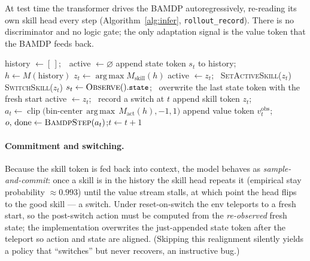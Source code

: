 \documentclass[11pt]{article}
\newcommand{\st}{s}
\newcommand{\skill}{z}
\newcommand{\argmax}{\operatorname*{arg\,max}}
\newcommand{\code}[1]{\texttt{\small #1}}
\begin{document}
At test time the transformer drives the BAMDP autoregressively, re-reading its own
skill head every step (Algorithm~\ref{alg:infer}, \code{rollout\_record}). There is no
discriminator and no logic gate; the only adaptation signal is the value token that
the BAMDP feeds back.

\begin{algorithm}[t]
\caption{Closed-loop rollout with on-line skill switching (\code{rollout\_record})}
\label{alg:infer}
\begin{algorithmic}[1]
\State history $\gets[\,]$;\ \ active $\gets \varnothing$
  \State append state token $\st_t$ to history; \ $h\gets M(\text{history})$
  \State $\skill_t \gets \argmax M_{\mathrm{skill}}(h)$
     \State active $\gets \skill_t$; \ \textsc{SetActiveSkill}($\skill_t$)
  \ElsIf{$\skill_t \neq$ active}
     \State \textsc{SwitchSkill}($\skill_t$)
     \State $\st_t \gets \textsc{Observe}().\code{state}$; \ overwrite the last state
            token with the fresh start
     \State active $\gets \skill_t$; \ record a switch at $t$
  \EndIf
  \State append skill token $\skill_t$;\quad
         $a_t \gets \operatorname{clip}\big(\text{bin-center}\,\argmax\,
         M_{\mathrm{act}}(h),-1,1\big)$
  \State append value token $v^{\mathrm{obs}}_t$;\quad
         $o,\,\text{done}\gets\textsc{BamdpStep}(a_t)$;\quad $t\gets t{+}1$
\EndWhile
\end{algorithmic}
\end{algorithm}

\paragraph{Commitment and switching.}
Because the skill token is fed back into context, the model behaves as
\emph{sample-and-commit}: once a skill is in the history the skill head repeats it
(empirical stay probability $\approx0.993$) until the value stream stalls, at which
point the head flips to the good skill --- a switch. Under reset-on-switch the env
teleports to a fresh start, so the post-switch action must be computed from the
\emph{re-observed} fresh state; the implementation overwrites the just-appended state
token after the teleport so action and state are aligned. (Skipping this realignment
silently yields a policy that ``switches'' but never recovers, an instructive bug.)
\end{document}
